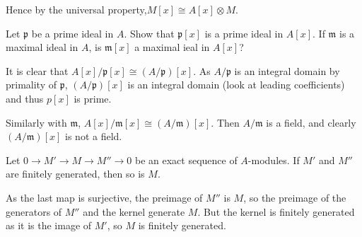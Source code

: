 \begin{questions}
\begin{solution}
		Hence by the universal property,$M[x] \cong A[x] \otimes M$.
	\end{solution}

	\question Let $\mathfrak{p}$ be a prime ideal in $A$. Show that $\mathfrak{p}[x]$ is a prime ideal in $A[x]$. If $\mathfrak{m}$ is a maximal ideal in $A $, is $\mathfrak{m}[x]$ a maximal ieal in $A[x] $?
	\begin{solution}
		It is clear that $A[x] / \mathfrak{p}[x] \cong (A / \mathfrak{p})[x]$.
		As $A / \mathfrak{p}$ is an integral domain by primality of $\mathfrak{p} $, $(A / \mathfrak{p})[x]$ is an integral domain (look at leading coefficients) and thus $p[x]$ is prime.

		Similarly with $\mathfrak{m} $, $A[x] / \mathfrak{m}[x] \cong (A / \mathfrak{m})[x]$.
		Then $A / \mathfrak{m}$ is a field, and clearly $(A / \mathfrak{m})[x]$ is not a field.
	\end{solution}

	\question

	\question Let $0\to M'\to M\to M''\to 0$ be an exact sequence of $A$-modules. If $M'$ and $M''$ are finitely generated, then so is $M$.
	\begin{solution}
		As the last map is surjective, the preimage of $M''$ is $M $, so the preimage of the generators of $M''$ and the kernel generate $M$.
		But the kernel is finitely generated as it is the image of $M' $, so $M$ is finitely generated.
	\end{solution}


\end{questions}
